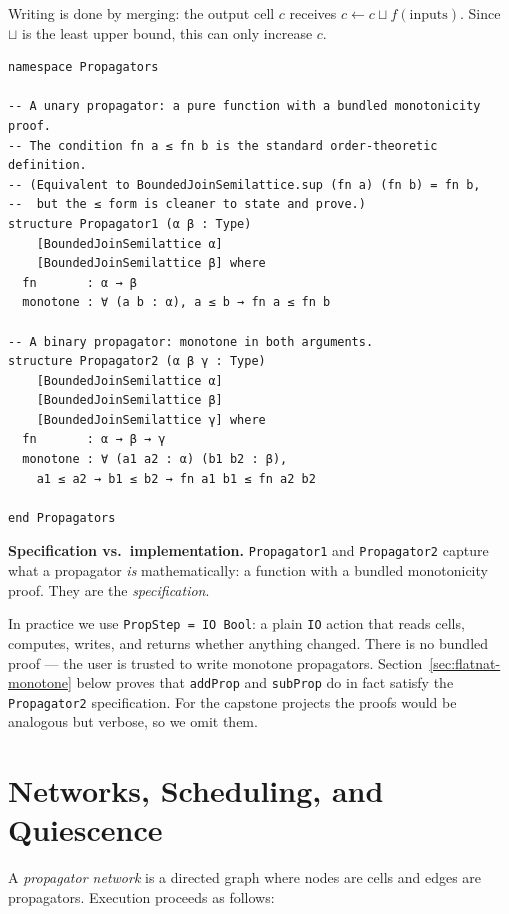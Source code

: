 \documentclass[12pt, a4paper, openright]{book}
\theoremstyle{thmstyle}
\theoremstyle{defstyle}
\newcommand{\lc}[1]{\texttt{#1}}
\newenvironment{notebox}{%
  \begin{tcolorbox}[notebox]%
}{\end{tcolorbox}}
\begin{document}
Writing is done by merging: the output cell $c$ receives $c \leftarrow c \sqcup f(\text{inputs})$.
Since $\sqcup$ is the least upper bound, this can only increase $c$.

\begin{verbatim}
namespace Propagators

-- A unary propagator: a pure function with a bundled monotonicity proof.
-- The condition fn a ≤ fn b is the standard order-theoretic definition.
-- (Equivalent to BoundedJoinSemilattice.sup (fn a) (fn b) = fn b,
--  but the ≤ form is cleaner to state and prove.)
structure Propagator1 (α β : Type)
    [BoundedJoinSemilattice α]
    [BoundedJoinSemilattice β] where
  fn       : α → β
  monotone : ∀ (a b : α), a ≤ b → fn a ≤ fn b

-- A binary propagator: monotone in both arguments.
structure Propagator2 (α β γ : Type)
    [BoundedJoinSemilattice α]
    [BoundedJoinSemilattice β]
    [BoundedJoinSemilattice γ] where
  fn       : α → β → γ
  monotone : ∀ (a1 a2 : α) (b1 b2 : β),
    a1 ≤ a2 → b1 ≤ b2 → fn a1 b1 ≤ fn a2 b2

end Propagators
\end{verbatim}

\begin{notebox}
  \textbf{Specification vs.\ implementation.}
  \lc{Propagator1} and \lc{Propagator2} capture what a propagator
  \emph{is} mathematically: a function with a bundled monotonicity proof.
  They are the \emph{specification}.

  In practice we use \lc{PropStep = IO Bool}: a plain \lc{IO} action that
  reads cells, computes, writes, and returns whether anything changed.
  There is no bundled proof --- the user is trusted to write monotone
  propagators. Section~\ref{sec:flatnat-monotone} below proves that
  \lc{addProp} and \lc{subProp} do in fact satisfy the \lc{Propagator2}
  specification. For the capstone projects the proofs would be analogous
  but verbose, so we omit them.
\end{notebox}

\section{Networks, Scheduling, and Quiescence}

A \emph{propagator network} is a directed graph where nodes are cells and edges
are propagators. Execution proceeds as follows:
\end{document}
